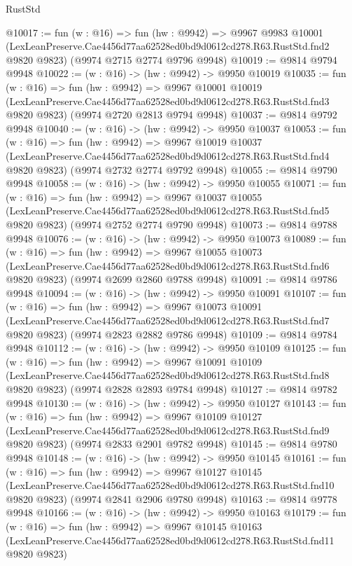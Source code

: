 \begin{lexlean}{RustStd}
\begin{coremodule}
@10017 := fun (w : @16) =>
  fun (hw : @9942) =>
  @9967
    @9983
    @10001
    (LexLeanPreserve.Cae4456d77aa62528ed0bd9d0612cd278.R63.RustStd.fnd2 @9820 @9823)
    (@9974 @2715 @2774 @9796 @9948)
@10019 := @9814 @9794 @9948
@10022 := (w : @16) -> (hw : @9942) -> @9950 @10019
@10035 := fun (w : @16) =>
  fun (hw : @9942) =>
  @9967
    @10001
    @10019
    (LexLeanPreserve.Cae4456d77aa62528ed0bd9d0612cd278.R63.RustStd.fnd3 @9820 @9823)
    (@9974 @2720 @2813 @9794 @9948)
@10037 := @9814 @9792 @9948
@10040 := (w : @16) -> (hw : @9942) -> @9950 @10037
@10053 := fun (w : @16) =>
  fun (hw : @9942) =>
  @9967
    @10019
    @10037
    (LexLeanPreserve.Cae4456d77aa62528ed0bd9d0612cd278.R63.RustStd.fnd4 @9820 @9823)
    (@9974 @2732 @2774 @9792 @9948)
@10055 := @9814 @9790 @9948
@10058 := (w : @16) -> (hw : @9942) -> @9950 @10055
@10071 := fun (w : @16) =>
  fun (hw : @9942) =>
  @9967
    @10037
    @10055
    (LexLeanPreserve.Cae4456d77aa62528ed0bd9d0612cd278.R63.RustStd.fnd5 @9820 @9823)
    (@9974 @2752 @2774 @9790 @9948)
@10073 := @9814 @9788 @9948
@10076 := (w : @16) -> (hw : @9942) -> @9950 @10073
@10089 := fun (w : @16) =>
  fun (hw : @9942) =>
  @9967
    @10055
    @10073
    (LexLeanPreserve.Cae4456d77aa62528ed0bd9d0612cd278.R63.RustStd.fnd6 @9820 @9823)
    (@9974 @2699 @2860 @9788 @9948)
@10091 := @9814 @9786 @9948
@10094 := (w : @16) -> (hw : @9942) -> @9950 @10091
@10107 := fun (w : @16) =>
  fun (hw : @9942) =>
  @9967
    @10073
    @10091
    (LexLeanPreserve.Cae4456d77aa62528ed0bd9d0612cd278.R63.RustStd.fnd7 @9820 @9823)
    (@9974 @2823 @2882 @9786 @9948)
@10109 := @9814 @9784 @9948
@10112 := (w : @16) -> (hw : @9942) -> @9950 @10109
@10125 := fun (w : @16) =>
  fun (hw : @9942) =>
  @9967
    @10091
    @10109
    (LexLeanPreserve.Cae4456d77aa62528ed0bd9d0612cd278.R63.RustStd.fnd8 @9820 @9823)
    (@9974 @2828 @2893 @9784 @9948)
@10127 := @9814 @9782 @9948
@10130 := (w : @16) -> (hw : @9942) -> @9950 @10127
@10143 := fun (w : @16) =>
  fun (hw : @9942) =>
  @9967
    @10109
    @10127
    (LexLeanPreserve.Cae4456d77aa62528ed0bd9d0612cd278.R63.RustStd.fnd9 @9820 @9823)
    (@9974 @2833 @2901 @9782 @9948)
@10145 := @9814 @9780 @9948
@10148 := (w : @16) -> (hw : @9942) -> @9950 @10145
@10161 := fun (w : @16) =>
  fun (hw : @9942) =>
  @9967
    @10127
    @10145
    (LexLeanPreserve.Cae4456d77aa62528ed0bd9d0612cd278.R63.RustStd.fnd10 @9820 @9823)
    (@9974 @2841 @2906 @9780 @9948)
@10163 := @9814 @9778 @9948
@10166 := (w : @16) -> (hw : @9942) -> @9950 @10163
@10179 := fun (w : @16) =>
  fun (hw : @9942) =>
  @9967
    @10145
    @10163
    (LexLeanPreserve.Cae4456d77aa62528ed0bd9d0612cd278.R63.RustStd.fnd11 @9820 @9823)

\end{coremodule}
\end{lexlean}
